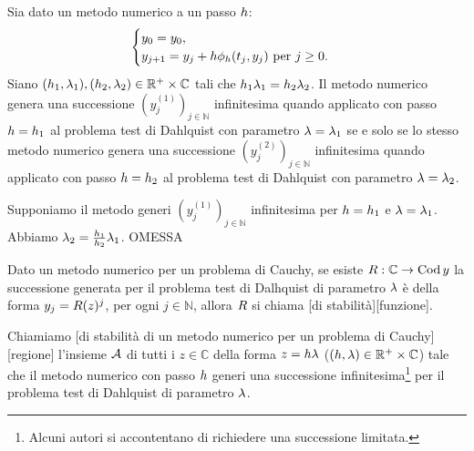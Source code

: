 \begin{Theorem}
	Sia dato un metodo numerico a un passo $h$:
	\[
	\begin{cases}
		y_0 = y_0,\\
		y_{j + 1} = y_j + h\phi_h(t_j,y_j)\text{ per }j \geq 0.
	\end{cases}
	\]
	Siano $(h_1,\lambda_1), (h_2,\lambda_2) \in \mathbb{R}^+ \times \mathbb{C}$ tali che $h_1\lambda_1 = h_2\lambda_2$. Il metodo numerico genera una successione $(y_j^{(1)})_{j \in \mathbb{N}}$ infinitesima quando applicato con passo $h = h_1$ al problema test di Dahlquist con parametro $\lambda = \lambda_1$ se e solo se lo stesso metodo numerico genera una successione $(y_j^{(2)})_{j \in \mathbb{N}}$ infinitesima quando applicato con passo $h = h_2$ al problema test di Dahlquist con parametro $\lambda = \lambda_2$.
\end{Theorem}
\Proof Supponiamo il metodo generi $(y_j^{(1)})_{j \in \mathbb{N}}$ infinitesima per $h = h_1$ e $\lambda = \lambda_1$. Abbiamo $\lambda_2 = \frac{h_1}{h_2} \lambda_1$. OMESSA
\begin{Definition}
	Dato un metodo numerico per un problema di Cauchy, se esiste $R: \mathbb{C} \rightarrow \operatorname{Cod}{y}$ la successione generata per il problema test di Dalhquist di parametro $\lambda$ \`e della forma $y_j = R(z)^j$, per ogni $j \in \mathbb{N}$, allora $R$ si chiama [di stabilit\`a][funzione].
\end{Definition}
\begin{Definition}
	Chiamiamo [di stabilit\`a di un metodo numerico per un problema di Cauchy][regione] l'insieme $\mathcal{A}$ di tutti i $z \in \mathbb{C}$ della forma $z = h \lambda$ ($(h,\lambda) \in \mathbb{R}^+ \times \mathbb{C}$) tale che il metodo numerico con passo $h$ generi una successione infinitesima\footnote{\label{MetodiNumericiPerEquazioniDifferenzialiOrdinarie_Nota_RegioneDiStabilita}Alcuni autori si accontentano di richiedere una successione limitata.} per il problema test di Dahlquist di parametro $\lambda$.
\end{Definition}
